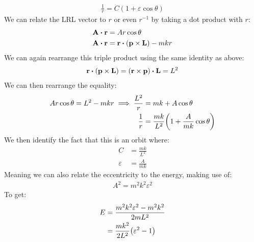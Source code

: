 \documentclass[12pt]{article}
\theoremstyle{plain}
\theoremstyle{definition}
\newcommand{\veps}{\varepsilon}
\begin{document}
\begin{align*}
  \frac1r=C(1+\veps\cos\theta)
\end{align*}
We can relate the LRL vector to $r$ or even $r^{-1}$ by taking a dot product with $r$:
\begin{align*}
  \vb{A\vdot r}&=Ar\cos\theta\\
  \vb{A\vdot r}&=\vb{r\vdot(p\times L)}-mkr
\end{align*}
We can again rearrange this triple product using the same identity as above:
\begin{align*}
  \vb{r\vdot(p\times L)}=\qty(\vb{r\times p})\vdot\vb{L}=L^2
\end{align*}
We can then rearrange the equality:
\begin{align*}
  Ar\cos\theta=L^2-mkr\implies \frac{L^2}{r}&=mk+A\cos\theta\\
  \frac{1}{r}&=\frac{mk}{L^2}\qty(1+\frac{A}{mk}\cos\theta)
\end{align*}
We then identify the fact that this is an orbit where:
\begin{align*}
  C&=\frac{mk}{L^2}\\
  \veps&=\frac{A}{mk}
\end{align*}
Meaning we can also relate the eccentricity to the energy, making use of:
\begin{align*}
  A^2=m^2k^2\veps^2
\end{align*}
To get:
\begin{align*}
  E&=\frac{m^2k^2\veps^2-m^2k^2}{2mL^2}\\
  &=\frac{mk^2}{2L^2}\qty(\veps^2-1)
\end{align*}
\end{document}
